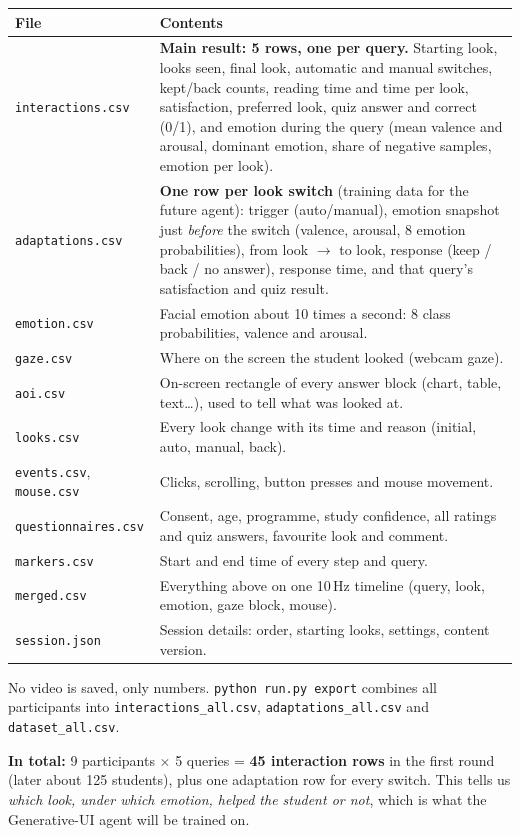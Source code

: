\documentclass[10pt,a4paper]{article}
\begin{document}
\begin{center}
\small
{}
\begin{tabularx}{\linewidth}{@{}p{3.6cm} L@{}}
\toprule
\textbf{File} & \textbf{Contents} \\
\midrule
\texttt{interactions.csv} & \textbf{Main result: 5 rows, one per query.} Starting look, looks seen, final look,
   automatic and manual switches, kept/back counts, reading time and time per look, satisfaction, preferred look,
   quiz answer and correct (0/1), and emotion during the query (mean valence and arousal, dominant emotion,
   share of negative samples, emotion per look). \\
\texttt{adaptations.csv} & \textbf{One row per look switch} (training data for the future agent): trigger
   (auto/manual), emotion snapshot just \emph{before} the switch (valence, arousal, 8 emotion probabilities), from
   look $\rightarrow$ to look, response (keep / back / no answer), response time, and that query's
   satisfaction and quiz result. \\
\texttt{emotion.csv} & Facial emotion about 10 times a second: 8 class probabilities, valence and arousal. \\
\texttt{gaze.csv} & Where on the screen the student looked (webcam gaze). \\
\texttt{aoi.csv} & On-screen rectangle of every answer block (chart, table, text\ldots), used to tell what was looked at. \\
\texttt{looks.csv} & Every look change with its time and reason (initial, auto, manual, back). \\
\texttt{events.csv}, \texttt{mouse.csv} & Clicks, scrolling, button presses and mouse movement. \\
\texttt{questionnaires.csv} & Consent, age, programme, study confidence, all ratings and quiz answers, favourite
   look and comment. \\
\texttt{markers.csv} & Start and end time of every step and query. \\
\texttt{merged.csv} & Everything above on one 10\,Hz timeline (query, look, emotion, gaze block, mouse). \\
\texttt{session.json} & Session details: order, starting looks, settings, content version. \\
\bottomrule
\end{tabularx}
\end{center}

No video is saved, only numbers. \texttt{python run.py export} combines all participants into
\texttt{interactions\_all.csv}, \texttt{adaptations\_all.csv} and \texttt{dataset\_all.csv}.

\textbf{In total:} 9 participants $\times$ 5 queries = \textbf{45 interaction rows} in the first round (later about 125
students), plus one adaptation row for every switch. This tells us \emph{which look, under which emotion, helped the
student or not}, which is what the Generative-UI agent will be trained on.
\end{document}
